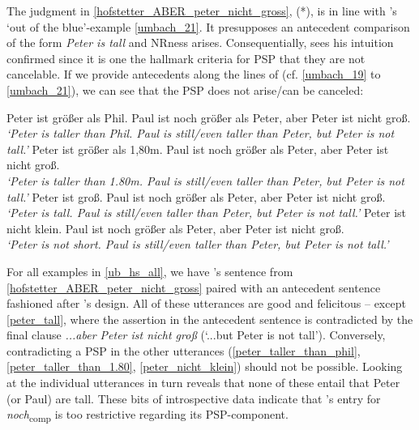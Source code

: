\documentclass[output=paper,
modfonts
]{langscibook}
\begin{document}
\noindent The judgment in \ref{hofstetter_ABER_peter_nicht_gross}, (*), is in line with \citeauthor{umbach2009a_comp}'s \citeyearpar{umbach2009a_comp} `out of the blue'-example \ref{umbach_21}. It presupposes an antecedent comparison of the form \textit{Peter is tall} and NRness arises. Consequentially, \citet{Hofstetter2013} sees his intuition confirmed since it is one the hallmark criteria for PSP that they are not cancelable. If we provide antecedents along the lines of \citeauthor{umbach2009a_comp} (cf. \ref{umbach_19} to \ref{umbach_21}), we can see that the PSP does not arise/can be canceled: 

\ea \label{ub_hs_all} \ea Peter ist größer als Phil. Paul ist noch größer als Peter, aber Peter ist nicht groß.\label{peter_taller_than_phil} \\ 
    \glt \textit{`Peter is taller than Phil. Paul is still/even taller than Peter, but Peter is not tall.'} \vspace{6pt}
\ex Peter ist größer als 1,80m.  Paul ist noch größer als Peter, aber Peter ist nicht groß.\label{peter_taller_than_1.80}\\ 
    \glt \textit{`Peter is taller than 1.80m. Paul is still/even taller than Peter, but Peter is not tall.'} \vspace{6pt}
\ex *Peter ist groß. Paul ist noch größer als Peter, aber Peter ist nicht groß.\label{peter_tall}\\ 
    \glt \textit{`Peter is tall. Paul is still/even taller than Peter, but Peter is not tall.'} \vspace{6pt}
\ex Peter ist nicht klein. Paul ist noch größer als Peter, aber Peter ist nicht groß.\label{peter_nicht_klein}\\
    \glt \textit{`Peter is not short. Paul is still/even taller than Peter, but Peter is not tall.'}
\z\z

For all examples in \ref{ub_hs_all}, we have \citeauthor{Hofstetter2013}'s sentence from \ref{hofstetter_ABER_peter_nicht_gross} paired with an antecedent sentence fashioned after \citeauthor{umbach2009a_comp}'s design. All of these utterances are good and felicitous -- except \ref{peter_tall}, where the assertion in the antecedent sentence is contradicted by the final clause \textit{...aber Peter ist nicht groß} (`...but Peter is not tall'). Conversely, contradicting a PSP in the other utterances (\ref{peter_taller_than_phil}, \ref{peter_taller_than_1.80}, \ref{peter_nicht_klein}) should not be possible. Looking at the individual utterances in turn reveals that none of these entail that Peter (or Paul) are tall. These bits of introspective data indicate that \citeauthor{Hofstetter2013}'s entry for \textit{noch}\textsubscript{comp} is too restrictive regarding its PSP-component. 
\end{document}
